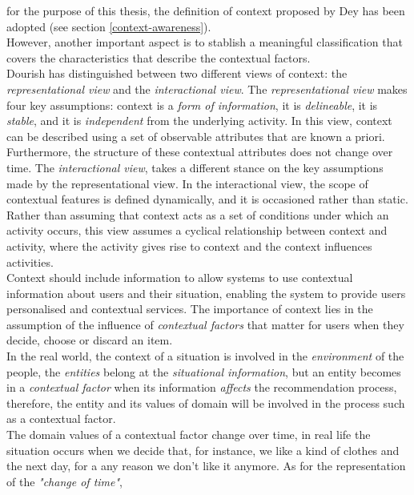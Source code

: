 for the purpose of this thesis, the definition of context
proposed by Dey  \cite{dey2001understanding} has been adopted (see section 
 \ref{context-awareness}). \\However, another important aspect 
is to stablish a meaningful classification that covers the 
characteristics that describe the contextual factors.\\
Dourish \cite{dourish2004we} has distinguished between two different
views of context: the \textit{representational view} and the
\textit{interactional view}. The \textit{representational view} makes
four key assumptions: context is a \textit{form of information}, it is
\textit{delineable}, it is \textit{stable}, and it is
\textit{independent} from the underlying activity. In this view,
context can be described using a set of observable attributes that are
known a priori. Furthermore, the structure of these contextual
attributes does not change over time. The \textit{interactional view},
takes a different stance on the key assumptions made by the
representational view. In the interactional view, the scope of
contextual features is defined dynamically, and it is occasioned
rather than static. Rather than assuming that context acts as a set of
conditions under which an activity occurs, this view assumes a
cyclical relationship between context and activity, where the activity
gives rise to context and the context influences activities.\\
Context should include information to allow systems to use contextual
information about users and their situation, enabling the system 
to provide users personalised and contextual services. The importance of
context lies in the  assumption of the influence of \textit{contextual
factors} that matter for users when they decide, choose or discard an
item.\\
In the real world, the context of a situation is involved in the
\textit{environment} of the people, the \textit{entities} belong at
the \textit{situational information}, but an entity becomes in a
\textit{contextual factor} when its information \textit{affects} the
recommendation process, therefore, the entity and its values of 
domain will be involved in the process such as a contextual factor.\\
The domain values of a contextual factor change over time, in
real life the situation occurs when we decide that, for instance,
we like a kind of clothes and the next day, for a any reason we don't
like it anymore. As for the representation of the \textit{"change of time"}, 
